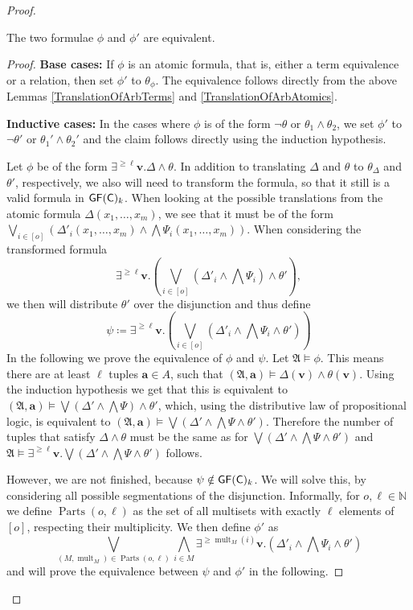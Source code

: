 \begin{proof}
	\begin{claim}
		The two formulae $\phi$ and $\phi'$ are equivalent.
	\end{claim}
	\begin{proof}
		\textbf{Base cases:}
		If $\phi$ is an atomic formula, that is, either a term equivalence or a relation, then set $\phi'$ to $\theta_\phi$.
		The equivalence follows directly from the above Lemmas \ref{TranslationOfArbTerms} and \ref{TranslationOfArbAtomics}.
		
		\textbf{Inductive cases:}
		In the cases where $\phi$ is of the form $\neg\theta$ or $\theta_1\land\theta_2$, we set $\phi'$ to $\neg\theta'$ or $\theta_1'\land\theta_2'$ and the claim follows directly using the induction hypothesis.
		
		Let $\phi$ be of the form $\exists^{\geq\ell}\mathbf v. \Delta\land \theta$.
		In addition to translating $\Delta$ and $\theta$ to $\theta_\Delta$ and $\theta'$, respectively, we also will need to transform the formula, so that it still is a valid formula in $\mathsf{GF}(\mathsf{C})_k$.
		When looking at the possible translations from the atomic formula $\Delta(x_1,\dots,x_m)$, we see that it must be of the form $\bigvee_{i\in[o]} (\Delta'_i(x_1,\dots,x_m) \land \bigwedge \Psi_i(x_1,\dots,x_m))$.
		When considering the transformed formula 
		$$\exists^{\geq \ell}\mathbf v. \left(\bigvee_{i\in [o]}\left(\Delta'_i\land\bigwedge \Psi_i\right) \land \theta'\right),$$
		we then will distribute $\theta'$ over the disjunction and thus define
		$$\psi \coloneqq \exists^{\geq \ell}\mathbf v. \left(\bigvee_{i\in[o]} \left(\Delta'_i\land\bigwedge \Psi_i \land \theta'\right)\right)$$
		In the following we prove the equivalence of $\phi$ and $\psi$.
		Let $\mathfrak A\models \phi$.
		This means there are at least $\ell$ tuples $\mathbf a\in A$, such that $(\mathfrak A,\mathbf a)\models \Delta(\mathbf v) \land \theta(\mathbf v)$.
		Using the induction hypothesis we get that this is equivalent to $(\mathfrak A,\mathbf a)\models \bigvee(\Delta'\land\bigwedge\Psi)\land \theta'$, which, using the distributive law of propositional logic, is equivalent to $(\mathfrak A,\mathbf a)\models \bigvee(\Delta'\land\bigwedge\Psi\land\theta')$.
		Therefore the number of tuples that satisfy $\Delta\land\theta$ must be the same as for $\bigvee(\Delta'\land\bigwedge\Psi\land\theta')$ and $\mathfrak A\models \exists^{\geq\ell}\mathbf v. \bigvee (\Delta'\land\bigwedge\Psi\land\theta')$ follows.
		
		However, we are not finished, because $\psi \notin \mathsf{GF}(\mathsf{C})_k$.
		We will solve this, by considering all possible segmentations of the disjunction.
		Informally, for $o,\ell\in\mathbb N$ we define $\operatorname{Parts}(o, \ell)$ as the set of all multisets with exactly $\ell$ elements of $[o]$, respecting their multiplicity.
		We then define $\phi'$ as
		$$\bigvee_{(M,\operatorname{mult}_M)\in \operatorname{Parts}(o,\ell)} \bigwedge_{i\in M} \exists^{\geq \operatorname{mult}_M(i)}\mathbf v. (\Delta'_i\land\bigwedge \Psi_i \land \theta')$$
		and will prove the equivalence between $\psi$ and $\phi'$ in the following. 
		

\end{proof}
\end{proof}
